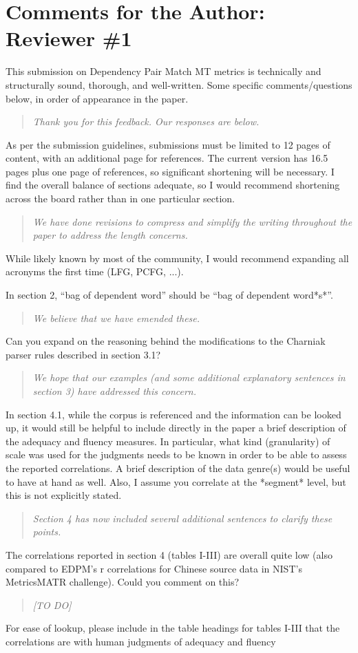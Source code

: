 \documentclass[letterpaper,12pt]{article}
\newenvironment{response}
{\begin{quotation} \it}
  {\end{quotation}}
\begin{document}
\section{Comments for the Author: Reviewer \#1}
\label{sec:reviewer1}

This submission on Dependency Pair Match MT metrics is technically and
structurally sound, thorough, and well-written.  Some specific
comments/questions below, in order of appearance in the paper.
\begin{response}
  Thank you for this feedback. Our responses are below.
\end{response}
As per the submission guidelines, submissions must be limited to 12
pages of content, with an additional page for references.  The current
version has 16.5 pages plus one page of references, so significant
shortening will be necessary.  I find the overall balance of sections
adequate, so I would recommend shortening across the board rather than
in one particular section.
\begin{response}
  We have done revisions to compress and simplify the writing
  throughout the paper to address the length concerns.
\end{response}
While likely known by most of the community, I would recommend
expanding all acronyms the first time (LFG, PCFG, ...).

In section 2, ``bag of dependent word'' should be ``bag of dependent
word*s*''.
\begin{response}
  We believe that we have emended these.
\end{response}
Can you expand on the reasoning behind the modifications to the
Charniak parser rules described in section 3.1?
\begin{response}
  We hope that our examples (and some additional explanatory sentences
  in section 3) have addressed this concern.
\end{response}
In section 4.1, while the corpus is referenced and the information can
be looked up, it would still be helpful to include directly in the
paper a brief description of the adequacy and fluency measures.  In
particular, what kind (granularity) of scale was used for the
judgments needs to be known in order to be able to assess the reported
correlations.  A brief description of the data genre(s) would be
useful to have at hand as well.  Also, I assume you correlate at the
*segment* level, but this is not explicitly stated.
\begin{response}
  Section 4 has now included several additional sentences to clarify
  these points.
\end{response}
The correlations reported in section 4 (tables I-III) are overall
quite low (also compared to EDPM's r correlations for Chinese source
data in NIST's MetricsMATR challenge).  Could you comment on this?
\begin{response}
 [TO DO]
\end{response}
For ease of lookup, please include in the table headings for tables
I-III that the correlations are with human judgments of adequacy and
fluency
\end{document}
